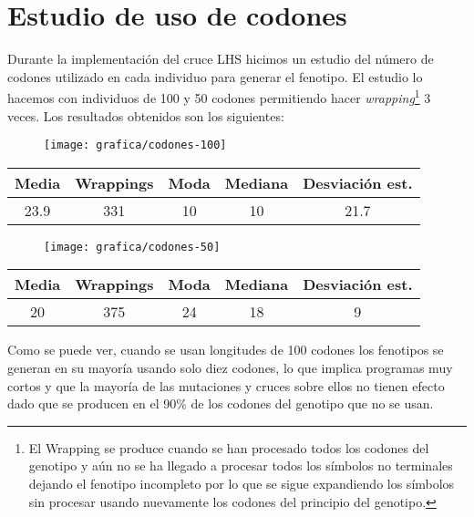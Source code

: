 \section{Estudio de uso de codones}
Durante la implementación del cruce LHS hicimos un estudio del número de codones utilizado en cada individuo para generar el fenotipo. El estudio lo hacemos con individuos de 100 y 50 codones permitiendo hacer \textit{wrapping}\footnote{El Wrapping se produce cuando se han procesado todos los codones del genotipo y aún no se ha llegado a procesar todos los símbolos no terminales dejando el fenotipo incompleto por lo que se sigue expandiendo los símbolos sin procesar usando nuevamente los codones del principio del genotipo.} 3 veces.  Los resultados obtenidos son los siguientes:
\begin{figure}[H]
\centering
\texttt{[image: grafica/codones-100]}
\end{figure}

\begin{table}[H]
\centering
\begin{tabular}{ccccc}
\hline
\textbf{Media} & \textbf{Wrappings} & \textbf{Moda} & \textbf{Mediana} & \textbf{Desviación  est.} \\ \hline
23.9           & 331                & 10            & 10               & 21.7                      \\ \hline
\end{tabular}
\end{table}

\begin{figure}[H]
\centering
\texttt{[image: grafica/codones-50]}
\end{figure}

\begin{table}[H]
\centering
\begin{tabular}{ccccc}
\hline
\textbf{Media} & \textbf{Wrappings} & \textbf{Moda} & \textbf{Mediana} & \textbf{Desviación  est.} \\ \hline
20           & 375                & 24            & 18               & 9                      \\ \hline
\end{tabular}
\end{table}

Como se puede ver, cuando se usan longitudes de 100 codones los fenotipos se generan en su mayoría usando solo diez codones, lo que implica programas muy cortos y que la mayoría de las mutaciones y cruces sobre ellos no tienen efecto dado que se producen en el 90\% de los codones del genotipo que no se usan.

